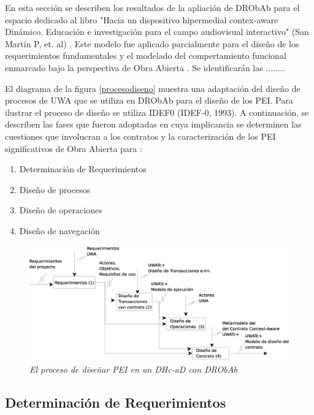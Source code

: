 \documentclass{llncs}
\begin{document}
En esta sección se describen los resultados de la apliación de DRObAb para el espacio dedicado al libro "Hacia un dispositivo hipermedial contex-aware Dinámico. Educación e investigación para el campo audiovisual interactivo" (San Martín P, et. al) \cite{libro}.  Este  modelo fue aplicado parcialmente para el diseño de los requerimientos fundamentales y el modelado del compertamiento funcional enmarcado bajo la perspectiva de Obra Abierta \cite{ObraAbierta}. Se identificarán las ........

El diagrama de la figura \ref{procesodiseno} muestra una adaptación del diseño de procesos de UWA \cite{UWA} que se utiliza en DRObAb para el diseño de los PEI. Para ilustrar el proceso de diseño se utiliza IDEF0 (IDEF-0, 1993). A continuación, se describen las fases que fueron adoptadas en cuya implicancia se determinen las cuestiones que involucran a los contratos y la caracterización de los PEI significativos de Obra Abierta para \cite{libro7}:

\begin{enumerate}
 \item Determinación de Requerimientos 
 \item Diseño de procesos
 \item Diseño de operaciones
 \item Diseño de navegación
\end{enumerate}

	\begin{figure}[!h]
        \begin{center}
	\includegraphics[width=6 in,totalheight=2 in]{procesodiseno.eps}
	\caption{\small \sl El proceso de diseñar PEI en un DHc-aD con DRObAb} \label{proceso de diseno}
         \end{center}
         \end{figure}

\subsection{Determinación de Requerimientos} \label{sdr}
\end{document}
